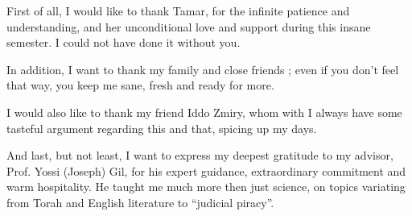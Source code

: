First of all, I would like to thank Tamar, for the infinite patience and
understanding, and her unconditional love and support during this insane
semester.  I could not have done it without you.

In addition, I want to thank my family and close friends ; even if you don't
feel that way, you keep me sane, fresh and ready for more.

I would also like to thank my friend Iddo Zmiry, whom with I always have some
tasteful argument regarding this and that, spicing up my days.

And last, but not least, I want to express my deepest gratitude to my advisor,
Prof. Yossi (Joseph) Gil, for his expert guidance, extraordinary commitment and
warm hospitality.  He taught me much more then just science, on topics
variating from Torah and English literature to “judicial piracy”.
